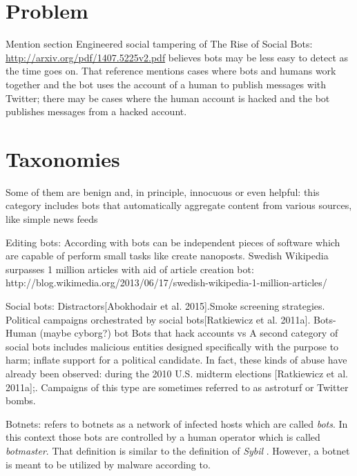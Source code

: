 \documentclass[twoside]{article}
\begin{document}
\begin{multicols}{2}
\section{Problem}
Mention section Engineered social tampering of The Rise of Social Bots: \url{http://arxiv.org/pdf/1407.5225v2.pdf}
\cite{emerging:2014} believes bots may be less easy to detect as the time goes on. That reference mentions cases where bots and humans work together and the bot uses the account of a human to publish messages with Twitter; there may be cases where the human account is hacked and the bot publishes messages from a hacked account.

\section{Taxonomies}
Some of them are benign and, in principle, innocuous
or even helpful: this category includes bots that automatically aggregate content
from various sources, like simple news feeds\cite{ferrara:2015}
    
Editing bots:
    According with \cite{kuhn:2015} bots can be independent pieces of software which are capable of perform small tasks like create nanoposts. 
    Swedish Wikipedia surpasses 1 million articles with aid of article creation bot: http://blog.wikimedia.org/2013/06/17/swedish-wikipedia-1-million-articles/

Social bots:
    Distractors[Abokhodair et al. 2015].Smoke screening strategies. Political campaigns orchestrated by social bots[Ratkiewicz et al. 2011a].
    Bots-Human (maybe cyborg?) bot
    Bots that hack accounts vs
    A second category of social bots includes malicious entities designed specifically with the purpose to harm\cite{ferrara:2015}; inflate support for 
    a political candidate. In fact, these kinds of abuse have already been observed: during the 2010 U.S. midterm elections [Ratkiewicz et al. 2011a];. 
    Campaigns of this type are sometimes referred to as astroturf or Twitter bombs\cite{ferrara:2015}.
    
Botnets:
    \cite{abu:2006} refers to botnets as a network of infected hosts which are called \emph{bots}. In this context those bots are controlled by a human
    operator which is called \emph{botmaster}. That definition is similar to the definition of \emph{Sybil} \cite{ferrara:2015}. However, a botnet
    is meant to be utilized by malware according to\cite{abu:2006}.




\end{multicols}
\end{document}
